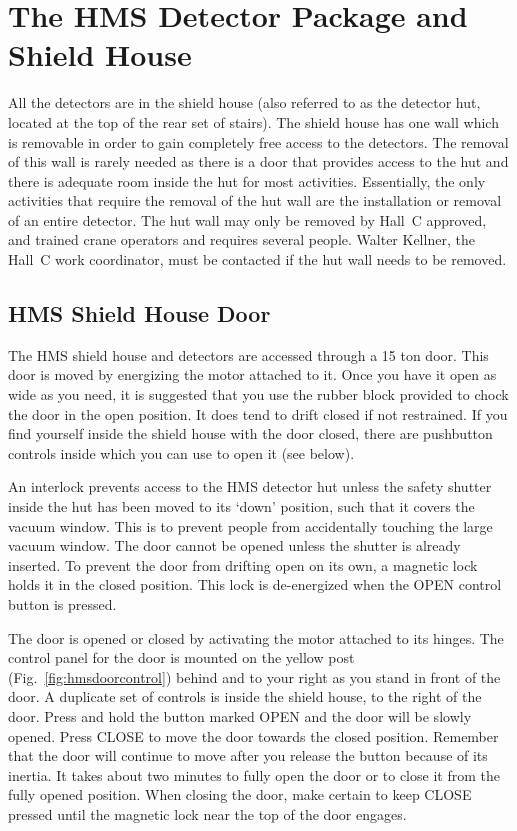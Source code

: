 
\section{The HMS Detector Package and Shield House }

All the detectors are in the shield house (also referred to as the detector hut,
located at the top of the
rear set of stairs). The shield house has one wall which is removable
in order to gain completely free access to the detectors. The removal
of this wall is rarely needed as there is a door that provides access
to the hut and there is adequate room inside the hut for most activities.
Essentially, the only activities that require the removal of the hut
wall are the installation or removal of an entire detector. The
hut wall may only be removed by Hall~C approved, and trained crane
operators and requires
several people.  Walter Kellner, the Hall~C work coordinator,
must be contacted if the hut wall needs to be removed.

\subsection{HMS Shield House Door}
The HMS shield house and detectors are accessed through a 15 ton
door. This door is moved by energizing the motor attached to it.
Once you have it open as wide as you need, it is suggested that you
use the rubber block provided to chock the door in the open
position. It does tend to drift closed if not restrained. If you find
yourself inside the shield house with the door closed, there are
pushbutton controls inside which you can use to open it (see below).

An interlock prevents access to the HMS detector hut unless the safety
shutter inside the hut has been moved to its `down' position, such
that it covers the vacuum window. This is to prevent people from
accidentally touching the large vacuum window. The door cannot be
opened unless the shutter is already inserted. To prevent the door
from drifting open on its own, a magnetic lock holds it in the closed
position. This lock is de-energized when the OPEN control button is
pressed.

The door is opened or closed by activating the motor attached to its
hinges. The control panel for the door is mounted on the yellow post
(Fig.~\ref{fig:hmsdoorcontrol}) behind
and to your right as you stand in front of the door. A duplicate set
of controls is inside the shield house, to the right of the
door. Press and hold the button marked OPEN and the door will be
slowly opened. Press CLOSE to move the door towards the closed
position. Remember that the door will continue to move after you
release the button because of its inertia. It takes about two minutes
to fully open the door or to close it from the fully opened
position. When closing the door, make certain to keep CLOSE pressed
until the magnetic lock near the top of the door engages.


